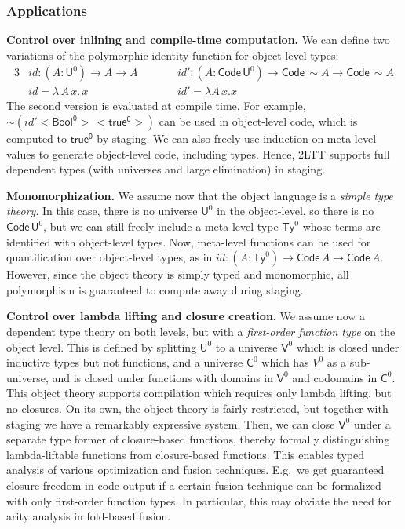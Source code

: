 \documentclass{easychair}
\newcommand{\U}{\mathsf{U}}
\newcommand{\Code}{\mathsf{Code}}
\newcommand{\Ty}{\mathsf{Ty}}
\newcommand{\V}{\mathsf{V}}
\newcommand{\C}{\mathsf{C}}
\begin{document}
\subsubsection*{Applications}

\textbf{Control over inlining and compile-time computation.} We can define two
variations of the polymorphic identity function for object-level types:
\begin{alignat*}{3}
  & \mathit{id} : (A : \U^0) \to A \to A \hspace{2em}&& \mathit{id'} : (A : \Code\,\U^0) \to \Code\,\sim\!A \to \Code\,\sim\!A\\
  & \mathit{id} = \lambda\,A\,x.\,x      && \mathit{id'} = \lambda A\,x.x
\end{alignat*}
The second version is evaluated at compile time. For example,
$\sim\!(\mathit{id'}<\!\mathsf{Bool^0}\!>\,<\!\mathsf{true^0}\!>)$ can be used
in object-level code, which is computed to $\mathsf{true^0}$ by staging. We can
also freely use induction on meta-level values to generate object-level code,
including types. Hence, 2LTT supports full dependent types (with universes and
large elimination) in staging.

\textbf{Monomorphization.} We assume now that the object language is a
\emph{simple type theory}. In this case, there is no universe $\U^0$ in the
object-level, so there is no $\Code\,\U^0$, but we can still freely include a
meta-level type $\Ty^0$ whose terms are identified with object-level types. Now,
meta-level functions can be used for quantification over object-level types, as
in $\mathit{id} : (A : \Ty^0) \to \Code\,A \to \Code\,A$. However, since the
object theory is simply typed and monomorphic, all polymorphism is guaranteed to
compute away during staging.

\textbf{Control over lambda lifting and closure creation}. We assume now a
dependent type theory on both levels, but with a \emph{first-order function
type} on the object level. This is defined by splitting $\U^0$ to a universe
$\V^0$ which is closed under inductive types but not functions, and a universe
$\C^0$ which has $V^0$ as a sub-universe, and is closed under functions with
domains in $\V^0$ and codomains in $\C^0$. This object theory supports
compilation which requires only lambda lifting, but no closures. On its own, the
object theory is fairly restricted, but together with staging we have a
remarkably expressive system. Then, we can close $\V^0$ under a separate type
former of closure-based functions, thereby formally distinguishing
lambda-liftable functions from closure-based functions. This enables typed
analysis of various optimization and fusion techniques. E.g.\ we get guaranteed
closure-freedom in code output if a certain fusion technique can be formalized
with only first-order function types. In particular, this may obviate the need
for arity analysis \cite{DBLP:journals/cl/Breitner18} in fold-based fusion.
\end{document}
